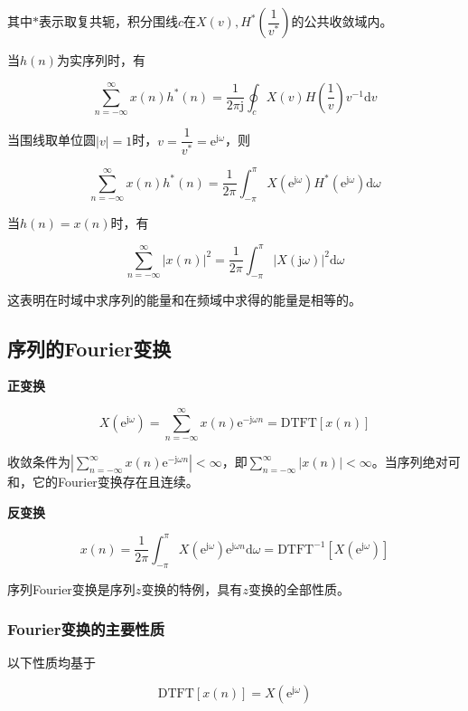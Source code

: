 \documentclass[cn, hazy, blue, normal, 14pt]{elegantnote}
\begin{document}
其中$*$表示取复共轭，积分围线$c$在$X(v), H^*\left(\dfrac{1}{v^*}\right)$的公共收敛域内。

当$h(n)$为实序列时，有

$$\sum_{n=-\infty}^{\infty}{x(n)h^*(n)}=\frac{1}{2\pi\text{j}}\oint_{c}{X(v)H\left(\frac{1}{v}\right)v^{-1}\text{d}v}$$

当围线取单位圆$|v|=1$时，$v=\dfrac{1}{v^*}=\text{e}^{\text{j}\omega}$，则

$$\sum_{n=-\infty}^{\infty}{x(n)h^*(n)}=\frac{1}{2\pi}\int_{-\pi}^{\pi}{X(\text{e}^{\text{j}\omega})H^*(\text{e}^{\text{j}\omega})\text{d}\omega}$$

当$h(n)=x(n)$时，有

$$\sum_{n=-\infty}^{\infty}{|x(n)|^2}=\frac{1}{2\pi}\int_{-\pi}^{\pi}{\left|X(\text{j}\omega)\right|^2\text{d}\omega}$$

这表明在时域中求序列的能量和在频域中求得的能量是相等的。

\subsection{序列的Fourier变换}

\textbf{正变换}

\begin{equation}
        X(\text{e}^{\text{j}\omega})=\sum_{n=-\infty}^{\infty}{x(n)\text{e}^{-\text{j}\omega n}}=\text{DTFT}[x(n)]
\end{equation}

收敛条件为$\left|\sum\limits_{n=-\infty}^{\infty}{x(n)\text{e}^{-\text{j}\omega n}}\right|<\infty$，即$\sum\limits_{n=-\infty}^{\infty}{\left|x(n)\right|}<\infty$。当序列绝对可和，它的Fourier变换存在且连续。

\textbf{反变换}

\begin{equation}
        x(n)=\frac{1}{2\pi}\int_{-\pi}^{\pi}X(\text{e}^{\text{j}\omega})\text{e}^{\text{j}\omega n}\text{d}\omega=\text{DTFT}^{-1}[X(\text{e}^{\text{j}\omega})]
\end{equation}

序列Fourier变换是序列$z$变换的特例，具有$z$变换的全部性质。

\subsubsection{Fourier变换的主要性质}

以下性质均基于

$$\text{DTFT}[x(n)]=X(\text{e}^{\text{j}\omega})$$
\end{document}
